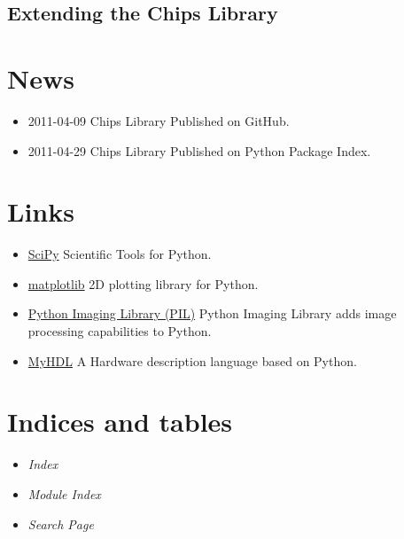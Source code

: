 \documentclass[letterpaper,10pt,english]{manual}
\begin{document}
\section{Extending the Chips Library}


\chapter{News}
\begin{itemize}
\item {} 
2011-04-09 Chips Library Published on GitHub.

\item {} 
2011-04-29 Chips Library Published on Python Package Index.

\end{itemize}


\chapter{Links}
\begin{itemize}
\item {} 
\href{http://scipy.org}{SciPy} Scientific Tools for Python.

\item {} 
\href{http://matplotlib.sourceforge.net}{matplotlib} 2D plotting library for Python.

\item {} 
\href{http://www.pythonware.com/products/pil/}{Python Imaging Library (PIL)} Python Imaging Library adds image processing
capabilities to Python.

\item {} 
\href{http://www.myhdl.org}{MyHDL} A Hardware description language based on Python.

\end{itemize}


\chapter{Indices and tables}
\begin{itemize}
\item {} 
\emph{Index}

\item {} 
\emph{Module Index}

\item {} 
\emph{Search Page}

\end{itemize}


\renewcommand{\indexname}{Module Index}
\printmodindex
\renewcommand{\indexname}{Index}
\printindex
\end{document}
